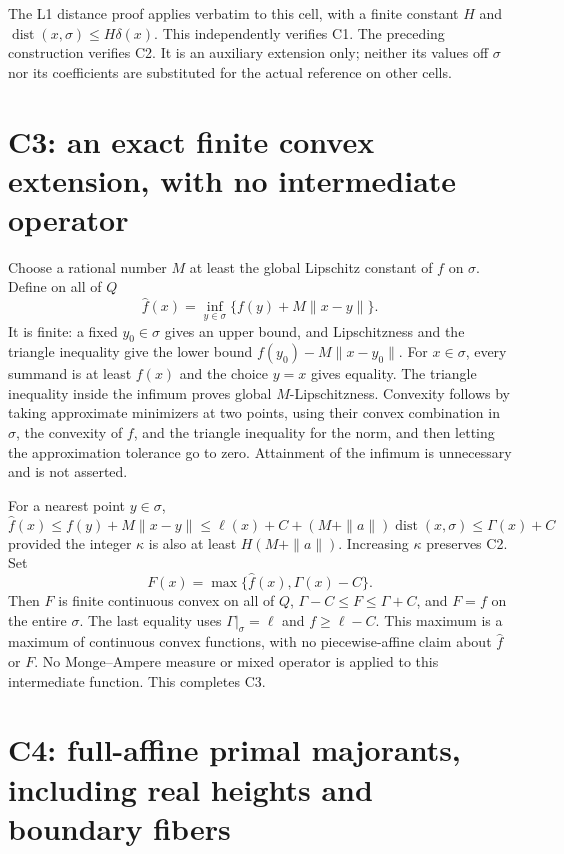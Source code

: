 \documentclass[
  11pt,
]{article}
\begin{document}
The L1 distance proof applies verbatim to this cell, with a finite
constant \(H\) and \(\operatorname{dist}(x,\sigma)\leq H\delta(x)\).
This independently verifies C1. The preceding construction verifies C2.
It is an auxiliary extension only; neither its values off \(\sigma\) nor
its coefficients are substituted for the actual reference on other
cells.

\section{C3: an exact finite convex extension, with no intermediate
operator}\label{c3-an-exact-finite-convex-extension-with-no-intermediate-operator}

Choose a rational number \(M\) at least the global Lipschitz constant of
\(f\) on \(\sigma\). Define on all of \(Q\)
\[ \widehat f(x)=\inf_{y\in\sigma}\{f(y)+M\|x-y\|\}. \] It is finite: a
fixed \(y_0\in\sigma\) gives an upper bound, and Lipschitzness and the
triangle inequality give the lower bound \(f(y_0)-M\|x-y_0\|\). For
\(x\in\sigma\), every summand is at least \(f(x)\) and the choice
\(y=x\) gives equality. The triangle inequality inside the infimum
proves global \(M\)-Lipschitzness. Convexity follows by taking
approximate minimizers at two points, using their convex combination in
\(\sigma\), the convexity of \(f\), and the triangle inequality for the
norm, and then letting the approximation tolerance go to zero.
Attainment of the infimum is unnecessary and is not asserted.

For a nearest point \(y\in\sigma\), \[
\widehat f(x)\leq f(y)+M\|x-y\|
\leq\ell(x)+C+(M+\|a\|)\operatorname{dist}(x,\sigma)
\leq\Gamma(x)+C
\] provided the integer \(\kappa\) is also at least \(H(M+\|a\|)\).
Increasing \(\kappa\) preserves C2. Set
\[ F(x)=\max\{\widehat f(x),\Gamma(x)-C\}. \] Then \(F\) is finite
continuous convex on all of \(Q\), \(\Gamma-C\leq F\leq\Gamma+C\), and
\(F=f\) on the entire \(\sigma\). The last equality uses
\(\Gamma|_\sigma=\ell\) and \(f\geq\ell-C\). This maximum is a maximum
of continuous convex functions, with no piecewise-affine claim about
\(\widehat f\) or \(F\). No Monge--Ampere measure or mixed operator is
applied to this intermediate function. This completes C3.

\section{C4: full-affine primal majorants, including real heights and
boundary
fibers}\label{c4-full-affine-primal-majorants-including-real-heights-and-boundary-fibers}
\end{document}
